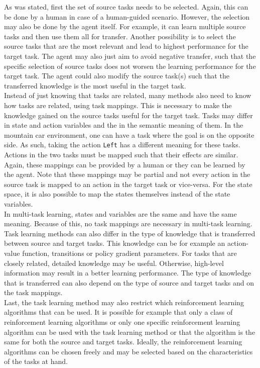 As was stated, first the set of source tasks needs to be selected. Again, this can be done by a human in case of a human-guided scenario. However, the selection may also be done by the agent itself. For example, it can learn multiple source tasks and then use them all for transfer.
Another possibility is to select the source tasks that are the most relevant and lead to highest performance for the target task.
The agent may also just aim to avoid negative transfer, such that the specific selection of source tasks does not worsen the learning performance for the target task.
The agent could also modify the source task(s) such that the transferred knowledge is the most useful in the target task.\\

Instead of just knowing that tasks are related, many methods also need to know how tasks are related, using task mappings. This is necessary to make the knowledge gained on the source tasks useful for the target task. Tasks may differ in state and action variables and the in the semantic meaning of them. In the mountain car environment, one can have a task where the goal is on the opposite side. As such, taking the action \texttt{Left} has a different meaning for these tasks. Actions in the two tasks must be mapped such that their effects are similar.\\
Again, these mappings can be provided by a human or they can be learned by the agent. Note that these mappings may be partial and not every action in the source task is mapped to an action in the target task or vice-versa. For the state space, it is also possible to map the states themselves instead of the state variables.\\
In multi-task learning, states and variables are the same and have the same meaning. Because of this, no task mappings are necessary in multi-task learning.\\

Task learning methods can also differ in the type of knowledge that is transferred between source and target tasks. This knowledge can be for example an action-value function, transitions or policy gradient parameters. For tasks that are closely related, detailed knowledge may be useful. Otherwise, high-level information may result in a better learning performance. The type of knowledge that is transferred can also depend on the type of source and target tasks and on the task mappings.\\

Last, the task learning method may also restrict which reinforcement learning algorithms that can be used. It is possible for example that only a class of reinforcement learning algorithms or only one specific reinforcement learning algorithm can be used with the task learning method or that the algorithm is the same for both the source and target tasks. Ideally, the reinforcement learning algorithms can be chosen freely and may be selected based on the characteristics of the tasks at hand.\\

